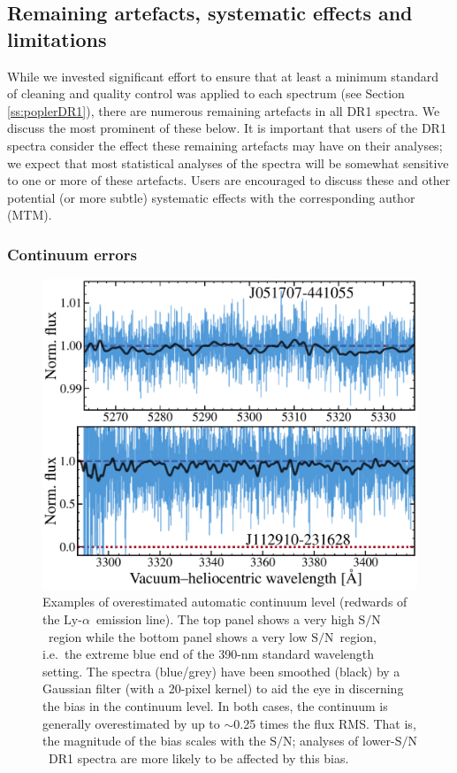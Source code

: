 \documentclass[fleqn,usenatbib,usedcolumn]{mnras}
\newcommand{\Sref}[1]{Section \ref{#1}}
\newcommand{\SN}{\ensuremath{\textrm{S/N}}}
\newcommand{\lya}{\ensuremath{\textrm{Ly-}\alpha}}
\begin{document}
\subsection{Remaining artefacts, systematic effects and limitations}\label{ss:artefacts}

While we invested significant effort to ensure that at least a minimum standard of cleaning and quality control was applied to each spectrum (see \Sref{ss:poplerDR1}), there are numerous remaining artefacts in all DR1 spectra. We discuss the most prominent of these below. It is important that users of the DR1 spectra consider the effect these remaining artefacts may have on their analyses; we expect that most statistical analyses of the spectra will be somewhat sensitive to one or more of these artefacts. Users are encouraged to discuss these and other potential (or more subtle) systematic effects with the corresponding author (MTM).

\subsubsection{Continuum errors}\label{sss:art_cont}

\begin{figure}
\begin{center}
\includegraphics[width=0.90\columnwidth]{DR1_cont_overestimate.pdf}
\vspace{-1em}
\caption{Examples of overestimated automatic continuum level (redwards of the \lya\ emission line). The top panel shows a very high \SN\ region while the bottom panel shows a very low \SN\ region, i.e.\ the extreme blue end of the 390-nm standard wavelength setting. The spectra (blue/grey) have been smoothed (black) by a Gaussian filter (with a 20-pixel kernel) to aid the eye in discerning the bias in the continuum level. In both cases, the continuum is generally overestimated by up to $\sim$0.25 times the flux RMS. That is, the magnitude of the bias scales with the \SN; analyses of lower-\SN\ DR1 spectra are more likely to be affected by this bias.}
\label{f:cont_overest}
\end{center}
\end{figure}
\end{document}

